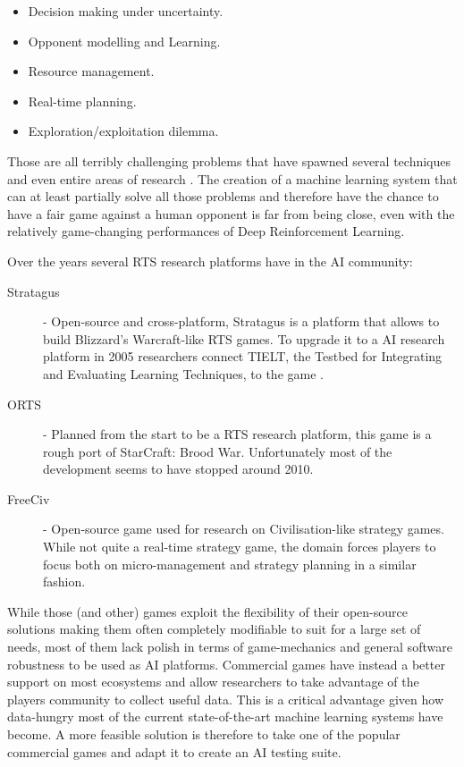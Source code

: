 \begin{itemize}
  \item Decision making under uncertainty.
  \item Opponent modelling and Learning.
  \item Resource management.
  \item Real-time planning.
  \item Exploration/exploitation dilemma.
\end{itemize}

Those are all terribly challenging problems that have spawned several techniques
and even entire areas of research \citep{buro2003real}. The creation of a
machine learning system that can at least partially solve all those problems and
therefore have the chance to have a fair game against a human opponent is far
from being close, even with the relatively game-changing performances of Deep
Reinforcement Learning.

Over the years several RTS research platforms have in the AI community:

\begin{description}
\item [Stratagus \citep{ponsen2005stratagus}] - Open-source and cross-platform,
  Stratagus is a platform that allows to build Blizzard's Warcraft-like RTS
  games. To upgrade it to a AI research platform in 2005 researchers connect
  TIELT, the Testbed for Integrating and Evaluating Learning Techniques, to the
  game \citep{molineaux2005tielt}.
\item [ORTS \citep{buro2002orts}] - Planned from the start to be a RTS
  research platform, this game is a rough port of StarCraft: Brood War.
  Unfortunately most of the development seems to have stopped around 2010.
\item [FreeCiv \citep{houk2004strategic}] - Open-source game used for research
  on Civilisation-like strategy games. While not quite a real-time strategy
  game, the domain forces players to focus both on micro-management and strategy
  planning in a similar fashion.
\end{description} 

While those (and other) games exploit the flexibility of their open-source
solutions making them often completely modifiable to suit for a large set of
needs, most of them lack polish in terms of game-mechanics and general software
robustness to be used as AI platforms. Commercial games have instead a better
support on most ecosystems and allow researchers to take advantage of the
players community to collect useful data. This is a critical advantage given how
data-hungry most of the current state-of-the-art machine learning systems have
become. A more feasible solution is therefore to take one of the popular
commercial games and adapt it to create an AI testing suite.

